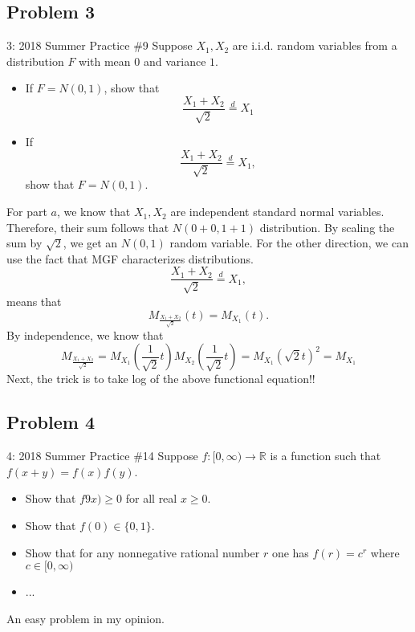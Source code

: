 \documentclass[../main]{subfiles}
\begin{document}
\subsection{Problem 3}
\begin{bbox}{3: 2018 Summer Practice \#9}
    Suppose $X_1, X_2$ are i.i.d. random variables from a distribution $F$ with mean $0$ and variance $1$.
    \begin{itemize}
        \item If $F=N(0,1)$, show that 
        \[
        \frac{X_1 + X_2}{\sqrt{2}}\overset{d}{=} X_1
        \]
        \item If \[
        \frac{X_1 + X_2}{\sqrt{2}}\overset{d}{=} X_1,
        \]
        show that $F=N(0,1)$.
    \end{itemize}
\end{bbox}
\begin{solution}
    For part $a$, we know that $X_1,X_2$ are independent standard normal variables. Therefore, their sum follows that $N(0+0, 1+1)$ distribution. By scaling the sum by $\sqrt{2}$, we get an $N(0,1)$ random variable.
    \newline
    For the other direction, we can use the fact that MGF characterizes distributions. 
    \[
        \frac{X_1 + X_2}{\sqrt{2}}\overset{d}{=} X_1,
        \] means that 
        \[
        M_{\frac{X_1+X_2}{\sqrt{2}}}(t) = M_{X_1}(t).
        \]
        By independence, we know that 
        \[
        M_{\frac{X_1+X_2}{\sqrt{2}}} = M_{X_1}(\frac{1}{\sqrt{2}}t)M_{X_2}(\frac{1}{\sqrt{2}}t) = M_{X_1}(\sqrt{2}t)^2 = M_{X_1} 
        \]
        Next, the trick is to take log of the above functional equation!!
\end{solution}
\subsection{Problem 4}
\begin{bbox}{4: 2018 Summer Practice \#14}
    Suppose $f:[0,\infty)\to \mathbb R$ is a function such that $f(x+y)=f(x)f(y)$. \begin{itemize}
        \item Show that $f9x)\ge 0$ for all real $x\ge 0$.
        \item Show that $f(0)\in \{0,1\}$.
        \item Show that for any nonnegative rational number $r$ one has $f(r) = c^r$ where $c\in [0,\infty)$
        \item ...
    \end{itemize}
\end{bbox}
\begin{solution}
    An easy problem in my opinion.
\end{solution}
\end{document}
